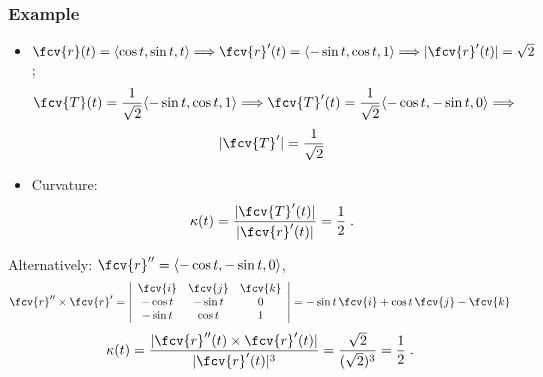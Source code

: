\begin{frame}
  \frametitle{Example}
  
  \begin{itemize}
    \item $\fcv{r}(t) = \langle \cos{t}, \sin{t}, t\rangle \Longrightarrow \fcv{r}'(t) = \langle -\sin{t}, \cos{t}, 1 \rangle \Longrightarrow|\fcv{r}'(t)| = \sqrt{2}$;
%
$$\fcv{T}(t) = \frac{1}{\sqrt{2}}
\langle -\sin{t}, \cos{t}, 1 \rangle
\Longrightarrow
\fcv{T}'(t) = \frac{1}{\sqrt{2}}
\langle -\cos{t}, -\sin{t}, 0 \rangle
\Longrightarrow $$
$$|\fcv{T}'|=\frac{1}{\sqrt{2}}$$
 \item Curvature:
%
$$\kappa(t) = \frac{|\fcv{T}'(t)|}{|\fcv{r}'(t)|} =
\frac{1}{2}\; .$$ 
  \end{itemize}

Alternatively: $\fcv{r}''= \langle -\cos{t}, -\sin{t}, 0 \rangle$,
%
$$\fcv{r}'' \times \fcv{r}' = \left|
\begin{array}{ccc}
\fcv{i} & \fcv{j} & \fcv{k} \\
-\cos{t}&  -\sin{t}&  0 \\
-\sin{t}& \cos{t}& 1
\end{array}
\right| = -\sin{t} \, \fcv{i} +
\cos{t}\, \fcv{j} -\fcv{k} $$
%
$$\kappa(t) =
\frac{|\fcv{r}''(t) \times \fcv{r}'(t)|}
{|\fcv{r}'(t)|^3} =
\frac{\sqrt{2}}{(\sqrt{2})^3} = \frac{1}{2}\; .$$

\end{frame}